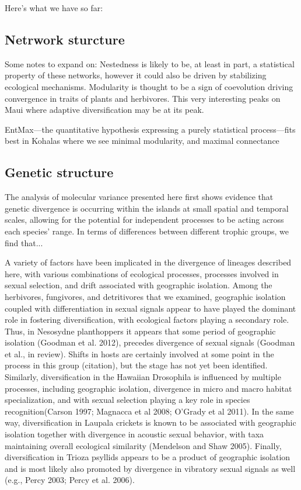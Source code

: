 \documentclass[12pt]{article}
\begin{document}
Here's what we have so far:

\subsection*{Netrwork sturcture}

Some notes to expand on: Nestedness is likely to be, at least in part,
a statistical property of these networks, however it could also be
driven by stabilizing ecological mechanisms. Modularity is thought to
be a sign of coevolution driving convergence in traits of plants and
herbivores. This very interesting peaks on Maui where adaptive
diversification may be at its peak.

EntMax---the quantitative hypothesis expressing a purely statistical
process---fits best in Kohalas where we see minimal modularity, and
maximal connectance

\subsection*{Genetic structure}

The analysis of molecular variance presented here
first shows evidence that genetic divergence is occurring within the
islands at small spatial and temporal scales, allowing for the
potential for independent processes to be acting across each species'
range. In terms of differences between different trophic groups, we
find that...

A variety of factors have been implicated in the divergence of
lineages described here, with various combinations of ecological
processes, processes involved in sexual selection, and drift
associated with geographic isolation. Among the herbivores,
fungivores, and detritivores that we examined, geographic isolation
coupled with differentiation in sexual signals appear to have played
the dominant role in fostering diversification, with ecological
factors playing a secondary role.  Thus, in Nesosydne planthoppers it
appears that some period of geographic isolation (Goodman et
al. 2012), precedes divergence of sexual signals (Goodman et al., in
review). Shifts in hosts are certainly involved at some point in the
process in this group (citation), but the stage has not yet been
identified. Similarly, diversification in the Hawaiian Drosophila is
influenced by multiple processes, including geographic isolation,
divergence in micro and macro habitat specialization, and with sexual
selection playing a key role in species recognition(Carson 1997;
Magnacca et al 2008; O'Grady et al 2011). In the same way,
diversification in Laupala crickets is known to be associated with
geographic isolation together with divergence in acoustic sexual
behavior, with taxa maintaining overall ecological similarity
(Mendelson and Shaw 2005). Finally, diversification in Trioza psyllids
appears to be a product of geographic isolation and is most likely
also promoted by divergence in vibratory sexual signals as well (e.g.,
Percy 2003; Percy et al. 2006). 
\end{document}
